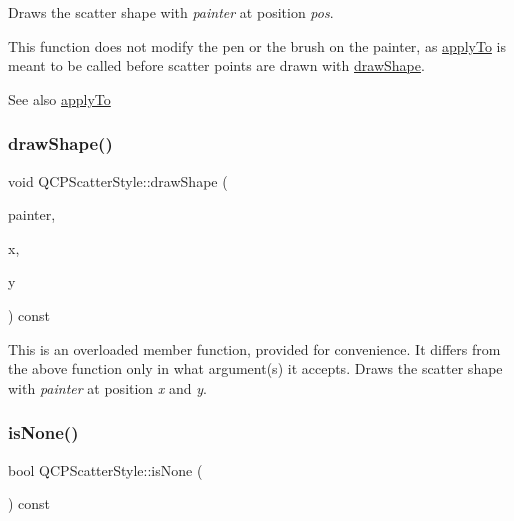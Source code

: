 Draws the scatter shape with {\itshape painter} at position {\itshape pos}.

This function does not modify the pen or the brush on the painter, as \hyperlink{classQCPScatterStyle_afd8044ece445300499ca0dc164821e0f}{apply\+To} is meant to be called before scatter points are drawn with \hyperlink{classQCPScatterStyle_a89b5105e6027bfcbfeefed9d201b607c}{draw\+Shape}.

\begin{DoxySeeAlso}{See also}
\hyperlink{classQCPScatterStyle_afd8044ece445300499ca0dc164821e0f}{apply\+To} 
\end{DoxySeeAlso}
\mbox{\label{classQCPScatterStyle_a95c297b114c77c22428ef40f54620ddf}} 
\subsubsection{\texorpdfstring{draw\+Shape()}{drawShape()}\hspace{0.1cm}{\footnotesize\ttfamily [2/2]}}
{\footnotesize\ttfamily void Q\+C\+P\+Scatter\+Style\+::draw\+Shape (\begin{DoxyParamCaption}\item[{\hyperlink{classQCPPainter}{Q\+C\+P\+Painter} $\ast$}]{painter,  }\item[{double}]{x,  }\item[{double}]{y }\end{DoxyParamCaption}) const}

This is an overloaded member function, provided for convenience. It differs from the above function only in what argument(s) it accepts. Draws the scatter shape with {\itshape painter} at position {\itshape x} and {\itshape y}. \mbox{\label{classQCPScatterStyle_a72db6bcb1e1abd6e53c1315dd3dea7e4}} 
\subsubsection{\texorpdfstring{is\+None()}{isNone()}}
{\footnotesize\ttfamily bool Q\+C\+P\+Scatter\+Style\+::is\+None (\begin{DoxyParamCaption}{ }\end{DoxyParamCaption}) const\hspace{0.3cm}{\ttfamily [inline]}}

